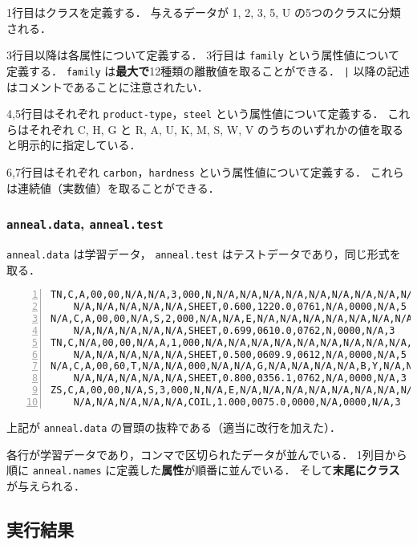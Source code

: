 \documentclass[a4paper, lualatex, ja=standard]{bxjsarticle}
\begin{document}
1行目はクラスを定義する．
与えるデータが 1, 2, 3, 5, U の5つのクラスに分類される．

3行目以降は各属性について定義する．
3行目は \verb|family| という属性値について定義する．
\verb|family| は\textbf{最大で}12種類の離散値を取ることができる．
\verb+|+ 以降の記述はコメントであることに注意されたい．

4,5行目はそれぞれ \verb|product-type|，\verb|steel| という属性値について定義する．
これらはそれぞれ C, H, G と
R, A, U, K, M, S, W, V のうちのいずれかの値を取ると明示的に指定している．

6,7行目はそれぞれ \verb|carbon|，\verb|hardness| という属性値について定義する．
これらは連続値（実数値）を取ることができる．

\subsubsection{\texttt{anneal.data}, \texttt{anneal.test}}

\verb|anneal.data| は学習データ，
\verb|anneal.test| はテストデータであり，同じ形式を取る．

\begin{Verbatim}[frame=single, label=anneal.data, numbers=left, fontsize=\small]
TN,C,A,00,00,N/A,N/A,3,000,N,N/A,N/A,N/A,N/A,N/A,N/A,N/A,N/A,N/A,C,N/A,N/A,N/A,N/A,N/A,N/A,
    N/A,N/A,N/A,N/A,N/A,SHEET,0.600,1220.0,0761,N/A,0000,N/A,5
N/A,C,A,00,00,N/A,S,2,000,N/A,N/A,E,N/A,N/A,N/A,N/A,N/A,N/A,N/A,N/A,N/A,N/A,N/A,N/A,N/A,N/A,
    N/A,N/A,N/A,N/A,N/A,SHEET,0.699,0610.0,0762,N,0000,N/A,3
TN,C,N/A,00,00,N/A,A,1,000,N/A,N/A,N/A,N/A,N/A,N/A,N/A,N/A,N/A,N/A,N/A,N/A,N/A,N/A,N/A,Y,N/A,
    N/A,N/A,N/A,N/A,N/A,SHEET,0.500,0609.9,0612,N/A,0000,N/A,5
N/A,C,A,00,60,T,N/A,N/A,000,N/A,N/A,G,N/A,N/A,N/A,N/A,B,Y,N/A,N/A,N/A,Y,N/A,N/A,N/A,N/A,
    N/A,N/A,N/A,N/A,N/A,SHEET,0.800,0356.1,0762,N/A,0000,N/A,3
ZS,C,A,00,00,N/A,S,3,000,N,N/A,E,N/A,N/A,N/A,N/A,N/A,N/A,N/A,N/A,N/A,N/A,N/A,N/A,N/A,N/A,
    N/A,N/A,N/A,N/A,N/A,COIL,1.000,0075.0,0000,N/A,0000,N/A,3
\end{Verbatim}

上記が \verb|anneal.data| の冒頭の抜粋である（適当に改行を加えた）．

各行が学習データであり，コンマで区切られたデータが並んでいる．
1列目から順に \verb|anneal.names| に定義した\textbf{属性}が順番に並んでいる．
そして\textbf{末尾にクラス}が与えられる．

\subsection{実行結果}
\end{document}
